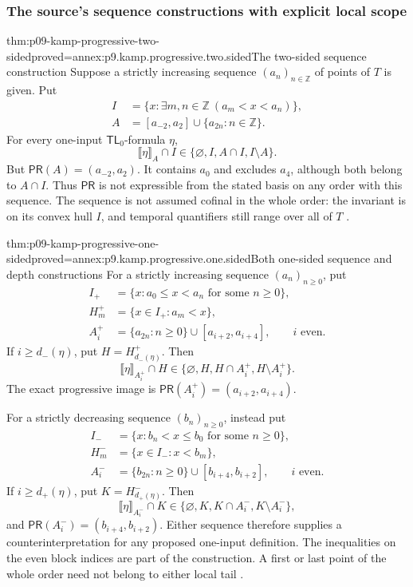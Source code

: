 \subsubsection{The source's sequence constructions with explicit local scope}

\begin{hblemma}{thm:p09-kamp-progressive-two-sided}{proved=annex:p9.kamp.progressive.two.sided}{The two-sided sequence construction}
Suppose a strictly increasing sequence \((a_n)_{n\in\mathbb Z}\)
of points of \(T\) is given. Put
\[
\begin{aligned}
 I&=\{x:\exists m,n\in\mathbb Z\ (a_m<x<a_n)\},\\
 A&=[a_{-2},a_2]\cup\{a_{2n}:n\in\mathbb Z\}.
\end{aligned}
\]
For every one-input \(\mathsf{TL}_0\)-formula \(\eta\),
\[
 \llbracket\eta\rrbracket_A\cap I
          \in\{\varnothing,I,A\cap I,I\setminus A\}.
\]
But \(\mathsf{PR}(A)=(a_{-2},a_2)\). It contains
\(a_0\) and excludes \(a_4\), although both belong to
\(A\cap I\). Thus \(\mathsf{PR}\) is not expressible
from the stated basis on any order with this sequence.
The sequence is not assumed cofinal in the whole order: the invariant
is on its convex hull \(I\), and temporal quantifiers still range
over all of \(T\)
\cite[pp.~113--114]{Kamp1968}.
\end{hblemma}

\begin{hblemma}{thm:p09-kamp-progressive-one-sided}{proved=annex:p9.kamp.progressive.one.sided}{Both one-sided sequence and depth constructions}
For a strictly increasing sequence \((a_n)_{n\geq0}\), put
\[
\begin{aligned}
 I_+&=\{x:a_0\leq x<a_n\text{ for some }n\geq0\},\\
 H_m^+&=\{x\in I_+:a_m<x\},\\
 A_i^+&=\{a_{2n}:n\geq0\}\cup[a_{i+2},a_{i+4}],
                   \qquad i\text{ even}.
\end{aligned}
\]
If \(i\geq d_-(\eta)\), put \(H=H_{d_-(\eta)}^+\).
Then
\[
 \llbracket\eta\rrbracket_{A_i^+}\cap H
             \in\{\varnothing,H,H\cap A_i^+,H\setminus A_i^+\}.
\]
The exact progressive image is
\(\mathsf{PR}(A_i^+)=(a_{i+2},a_{i+4})\).

For a strictly decreasing sequence \((b_n)_{n\geq0}\), instead put
\[
\begin{aligned}
 I_-&=\{x:b_n<x\leq b_0\text{ for some }n\geq0\},\\
 H_m^-&=\{x\in I_-:x<b_m\},\\
 A_i^-&=\{b_{2n}:n\geq0\}\cup[b_{i+4},b_{i+2}],
                   \qquad i\text{ even}.
\end{aligned}
\]
If \(i\geq d_+(\eta)\), put \(K=H_{d_+(\eta)}^-\).
Then
\[
 \llbracket\eta\rrbracket_{A_i^-}\cap K
             \in\{\varnothing,K,K\cap A_i^-,K\setminus A_i^-\},
\]
and
\(\mathsf{PR}(A_i^-)=(b_{i+4},b_{i+2})\).
Either sequence therefore supplies a counterinterpretation for any
proposed one-input definition. The inequalities on the even block
indices are part of the construction. A first or last point of the
whole order need not belong to either local tail
\cite[pp.~114--116]{Kamp1968}.
\end{hblemma}

